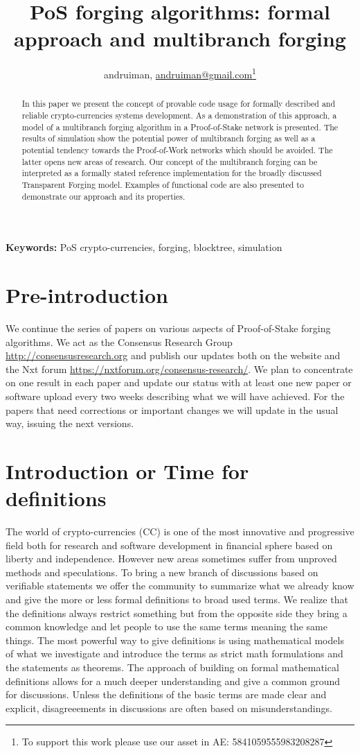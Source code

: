 \documentclass[12pt]{article}
\author{andruiman, \href{maito: andruiman@gmail.com}{andruiman@gmail.com}\footnote{To support this work please use our asset in AE: 5841059555983208287}}
\title{PoS forging algorithms: formal approach and multibranch forging}
\begin{document}
\maketitle
\begin{abstract}
In this paper we present the concept of provable code usage for formally described and reliable crypto-currencies systems development. 
As a demonstration of this approach, a model of a multibranch forging algorithm in a Proof-of-Stake network is presented. 
The results of simulation show the potential power of multibranch forging as well as a potential tendency towards the 
Proof-of-Work networks which should be avoided. The latter opens new areas of research. Our concept of the multibranch forging can be interpreted 
as a formally stated reference implementation for the broadly discussed Transparent Forging model. Examples of functional code are also presented to 
demonstrate our approach and its properties.
\end{abstract}

\noindent
{\bf Keywords:} PoS crypto-currencies, forging, blocktree, simulation

\section{Pre-introduction}
We continue the series of papers on various aspects of Proof-of-Stake forging algorithms. We act as the Consensus Research 
Group \url{http://consensusresearch.org} and publish our updates both on the website and the Nxt forum \url{https://nxtforum.org/consensus-research/}.
We plan to concentrate on one result in each paper and update our status with at least one new paper or software upload every two weeks describing 
what we will have achieved. For the papers that need corrections or important changes we will update in the usual way,
issuing the next versions. 

\section{Introduction or Time for definitions}
The world of crypto-currencies (CC) is one of the most innovative and progressive field both for research 
and software development in financial sphere based on liberty and independence. However new areas sometimes suffer from unproved methods and speculations.  
To bring a new branch of discussions based on verifiable statements we offer the community to summarize what we already know and give the more or less formal 
definitions to broad used terms. We realize that the definitions always restrict something but from the opposite side they bring a common knowledge and let people 
to use the same terms meaning the same things. The most powerful way to give definitions is using mathematical models of what we investigate and introduce the 
terms as strict math formulations and the statements as theorems. The approach of building on formal mathematical definitions allows
for a much deeper understanding and give a common ground for discussions. Unless the definitions of the basic terms are made clear and explicit,
disagreeements in discussions are often based on misunderstandings.
\end{document}
